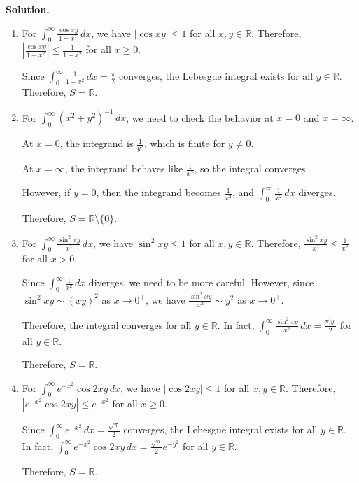 \noindent\textbf{Solution.}
\begin{enumerate}[label=(\alph*)]
    \item For $\int_{0}^{\infty} \frac{\cos xy}{1 + x^2} \, dx$, we have $|\cos xy| \leq 1$ for all $x, y \in \mathbb{R}$. Therefore, $|\frac{\cos xy}{1 + x^2}| \leq \frac{1}{1 + x^2}$ for all $x \geq 0$.
    
    Since $\int_{0}^{\infty} \frac{1}{1 + x^2} \, dx = \frac{\pi}{2}$ converges, the Lebesgue integral exists for all $y \in \mathbb{R}$. Therefore, $S = \mathbb{R}$.
    
    \item For $\int_{0}^{\infty} (x^2 + y^2)^{-1} \, dx$, we need to check the behavior at $x = 0$ and $x = \infty$.
    
    At $x = 0$, the integrand is $\frac{1}{y^2}$, which is finite for $y \neq 0$.
    
    At $x = \infty$, the integrand behaves like $\frac{1}{x^2}$, so the integral converges.
    
    However, if $y = 0$, then the integrand becomes $\frac{1}{x^2}$, and $\int_{0}^{\infty} \frac{1}{x^2} \, dx$ diverges.
    
    Therefore, $S = \mathbb{R} \setminus \{0\}$.
    
    \item For $\int_{0}^{\infty} \frac{\sin^2 xy}{x^2} \, dx$, we have $\sin^2 xy \leq 1$ for all $x, y \in \mathbb{R}$. Therefore, $\frac{\sin^2 xy}{x^2} \leq \frac{1}{x^2}$ for all $x > 0$.
    
    Since $\int_{0}^{\infty} \frac{1}{x^2} \, dx$ diverges, we need to be more careful. However, since $\sin^2 xy \sim (xy)^2$ as $x \to 0^+$, we have $\frac{\sin^2 xy}{x^2} \sim y^2$ as $x \to 0^+$.
    
    Therefore, the integral converges for all $y \in \mathbb{R}$. In fact, $\int_{0}^{\infty} \frac{\sin^2 xy}{x^2} \, dx = \frac{\pi|y|}{2}$ for all $y \in \mathbb{R}$.
    
    Therefore, $S = \mathbb{R}$.
    
    \item For $\int_{0}^{\infty} e^{-x^2} \cos 2xy \, dx$, we have $|\cos 2xy| \leq 1$ for all $x, y \in \mathbb{R}$. Therefore, $|e^{-x^2} \cos 2xy| \leq e^{-x^2}$ for all $x \geq 0$.
    
    Since $\int_{0}^{\infty} e^{-x^2} \, dx = \frac{\sqrt{\pi}}{2}$ converges, the Lebesgue integral exists for all $y \in \mathbb{R}$. In fact, $\int_{0}^{\infty} e^{-x^2} \cos 2xy \, dx = \frac{\sqrt{\pi}}{2} e^{-y^2}$ for all $y \in \mathbb{R}$.
    
    Therefore, $S = \mathbb{R}$.
\end{enumerate}

